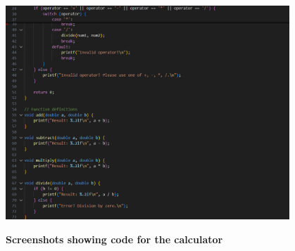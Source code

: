 \documentclass[a4paper,12pt]{article}
\begin{document}
\par\vspace{2em}
\includegraphics[width=0.8\textwidth]{srija1.png}
\par\vspace{2em}
\large\textbf{Screenshots showing code for the calculator}
\vspace{0.3in}
\end{document}
